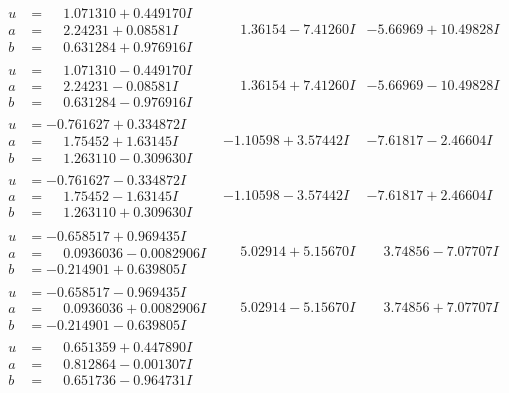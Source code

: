 \documentclass[1p]{elsarticle_modified}
\theoremstyle{definition}
\begin{document}
$$\begin{array}{c|c|c}
\begin{aligned}
u &= \phantom{-}1.071310 + 0.449170 I \\
a &= \phantom{-}2.24231 + 0.08581 I \\
b &= \phantom{-}0.631284 + 0.976916 I\end{aligned}
 & \phantom{-}1.36154 - 7.41260 I & -5.66969 + 10.49828 I \\ \hline\begin{aligned}
u &= \phantom{-}1.071310 - 0.449170 I \\
a &= \phantom{-}2.24231 - 0.08581 I \\
b &= \phantom{-}0.631284 - 0.976916 I\end{aligned}
 & \phantom{-}1.36154 + 7.41260 I & -5.66969 - 10.49828 I \\ \hline\begin{aligned}
u &= -0.761627 + 0.334872 I \\
a &= \phantom{-}1.75452 + 1.63145 I \\
b &= \phantom{-}1.263110 - 0.309630 I\end{aligned}
 & -1.10598 + 3.57442 I & -7.61817 - 2.46604 I \\ \hline\begin{aligned}
u &= -0.761627 - 0.334872 I \\
a &= \phantom{-}1.75452 - 1.63145 I \\
b &= \phantom{-}1.263110 + 0.309630 I\end{aligned}
 & -1.10598 - 3.57442 I & -7.61817 + 2.46604 I \\ \hline\begin{aligned}
u &= -0.658517 + 0.969435 I \\
a &= \phantom{-}0.0936036 - 0.0082906 I \\
b &= -0.214901 + 0.639805 I\end{aligned}
 & \phantom{-}5.02914 + 5.15670 I & \phantom{-}3.74856 - 7.07707 I \\ \hline\begin{aligned}
u &= -0.658517 - 0.969435 I \\
a &= \phantom{-}0.0936036 + 0.0082906 I \\
b &= -0.214901 - 0.639805 I\end{aligned}
 & \phantom{-}5.02914 - 5.15670 I & \phantom{-}3.74856 + 7.07707 I \\ \hline\begin{aligned}
u &= \phantom{-}0.651359 + 0.447890 I \\
a &= \phantom{-}0.812864 - 0.001307 I \\
b &= \phantom{-}0.651736 - 0.964731 I\end{aligned}

\end{array}$$
\end{document}
